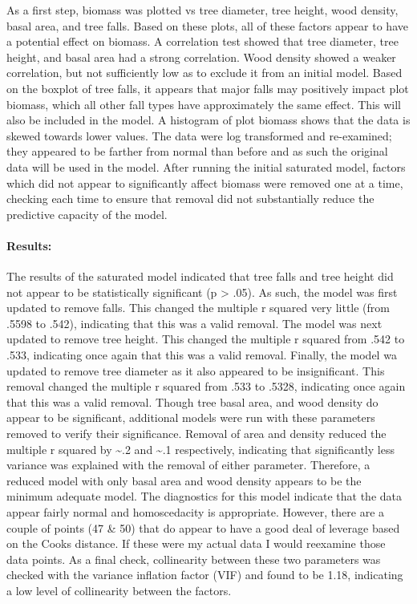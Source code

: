 \documentclass[]{article}
\let\oldparagraph\paragraph
\renewcommand{\paragraph}[1]{\oldparagraph{#1}\mbox{}}
\begin{document}
As a first step, biomass was plotted vs tree diameter, tree height, wood
density, basal area, and tree falls. Based on these plots, all of these
factors appear to have a potential effect on biomass. A correlation test
showed that tree diameter, tree height, and basal area had a strong
correlation. Wood density showed a weaker correlation, but not
sufficiently low as to exclude it from an initial model. Based on the
boxplot of tree falls, it appears that major falls may positively impact
plot biomass, which all other fall types have approximately the same
effect. This will also be included in the model. A histogram of plot
biomass shows that the data is skewed towards lower values. The data
were log transformed and re-examined; they appeared to be farther from
normal than before and as such the original data will be used in the
model. After running the initial saturated model, factors which did not
appear to significantly affect biomass were removed one at a time,
checking each time to ensure that removal did not substantially reduce
the predictive capacity of the model.

\paragraph{Results:}\label{results}

The results of the saturated model indicated that tree falls and tree
height did not appear to be statistically significant (p \textgreater{}
.05). As such, the model was first updated to remove falls. This changed
the multiple r squared very little (from .5598 to .542), indicating that
this was a valid removal. The model was next updated to remove tree
height. This changed the multiple r squared from .542 to .533,
indicating once again that this was a valid removal. Finally, the model
wa updated to remove tree diameter as it also appeared to be
insignificant. This removal changed the multiple r squared from .533 to
.5328, indicating once again that this was a valid removal. Though tree
basal area, and wood density do appear to be significant, additional
models were run with these parameters removed to verify their
significance. Removal of area and density reduced the multiple r squared
by \textasciitilde{}.2 and \textasciitilde{}.1 respectively, indicating
that significantly less variance was explained with the removal of
either parameter. Therefore, a reduced model with only basal area and
wood density appears to be the minimum adequate model. The diagnostics
for this model indicate that the data appear fairly normal and
homoscedacity is appropriate. However, there are a couple of points (47
\& 50) that do appear to have a good deal of leverage based on the Cooks
distance. If these were my actual data I would reexamine those data
points. As a final check, collinearity between these two parameters was
checked with the variance inflation factor (VIF) and found to be 1.18,
indicating a low level of collinearity between the factors.
\end{document}
